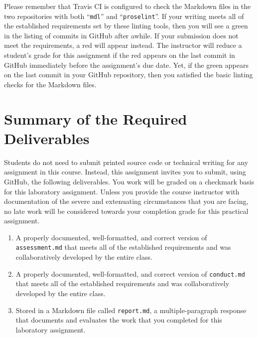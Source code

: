 \documentclass[11pt]{article}
\newcommand{\assessment}{\lstinline{assessment.md}}
\newcommand{\conduct}{\lstinline{conduct.md}}
\newcommand{\reflection}{\lstinline{report.md}}
\newcommand{\command}[1]{``\lstinline{#1}''}
\newcommand{\checkmark}{\ding{51}}
\newcommand{\naughtmark}{\ding{55}}
\begin{document}
Please remember that Travis CI is configured to check the Markdown files in the
two repositories with both \command{mdl} and \command{proselint}.
%
If your writing meets all of the established requirements set by these linting
tools, then you will see a green \checkmark{} in the listing of commits in
GitHub after awhile. If your submission does not meet the requirements, a red
\naughtmark{} will appear instead. The instructor will reduce a student's grade
for this assignment if the red \naughtmark{} appears on the last commit in
GitHub immediately before the assignment's due date. Yet, if the green
\checkmark{} appears on the last commit in your GitHub repository, then you
satisfied the basic linting checks for the Markdown files.

\section*{Summary of the Required Deliverables}

\noindent Students do not need to submit printed source code or technical
writing for any assignment in this course. Instead, this assignment invites you
to submit, using GitHub, the following deliverables. You work will be graded on
a checkmark basis for this laboratory assignment.
%
Unless you provide the course instructor with documentation of the severe and
extenuating circumstances that you are facing, no late work will be considered
towards your completion grade for this practical assignment.

\begin{enumerate}

\setlength{\itemsep}{0in}

\item A properly documented, well-formatted, and correct version of
  \assessment{} that meets all of the established requirements and was
  collaboratively developed by the entire class.

\item A properly documented, well-formatted, and correct version of
  \conduct{} that meets all of the established requirements and was
  collaboratively developed by the entire class.

\item Stored in a Markdown file called \reflection{}, a multiple-paragraph
  response that documents and evaluates the work that you completed for this
  laboratory assignment.

\end{enumerate}
\end{document}
